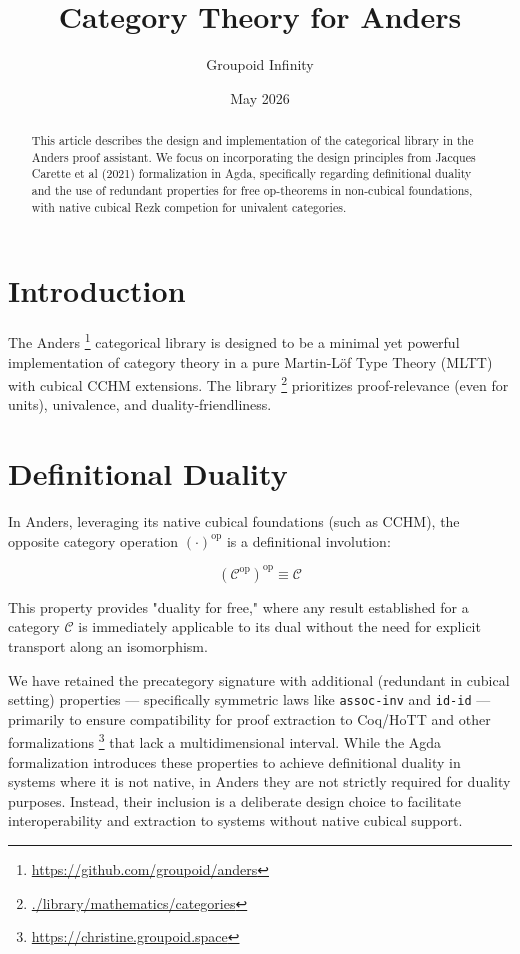 \documentclass[11pt]{article}
\title{Category Theory for Anders}
\author{Groupoid Infinity}
\date{May 2026}
\newcommand{\catC}{\mathcal{C}}
\newcommand{\op}{^\text{op}}
\begin{document}
\maketitle

\begin{abstract}
This article describes the design and implementation of the categorical library in the Anders proof assistant.
We focus on incorporating the design principles from Jacques Carette et al (2021) formalization in Agda,
specifically regarding definitional duality and the use of redundant properties for free op-theorems
in non-cubical foundations, with native cubical Rezk competion for univalent categories.
\end{abstract}

\tableofcontents

\section{Introduction}

The Anders \footnote{\url{https://github.com/groupoid/anders}} categorical library is designed to be a minimal yet powerful
implementation of category theory in a pure Martin-Löf Type Theory (MLTT)
with cubical CCHM extensions. The library \footnote{\url{./library/mathematics/categories}}
prioritizes proof-relevance (even for units), univalence, and duality-friendliness.

\section{Definitional Duality}

In Anders, leveraging its native cubical foundations (such as CCHM),
the opposite category operation $(\cdot)\op$ is a definitional involution:

\begin{equation}
    (\catC\op)\op \equiv \catC
\end{equation}

This property provides "duality for free," where any result established for a category $\catC$
is immediately applicable to its dual without the need for explicit transport along an isomorphism.

We have retained the precategory signature with additional (redundant in cubical setting)
properties --- specifically symmetric laws like \texttt{assoc-inv} and \texttt{id-id} ---
primarily to ensure compatibility for proof extraction to Coq/HoTT and other
formalizations \footnote{\url{https://christine.groupoid.space}} that lack a multidimensional interval. While the Agda
formalization \cite{carette2021} introduces these properties to achieve
definitional duality in systems where it is not native, in Anders they
are not strictly required for duality purposes. Instead, their inclusion
is a deliberate design choice to facilitate interoperability and extraction
to systems without native cubical support.
\end{document}
